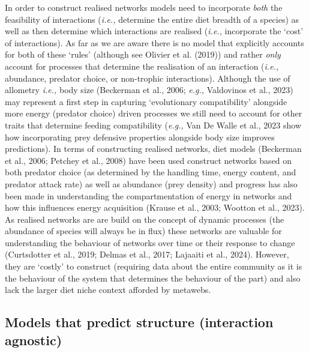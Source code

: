 \documentclass[
]{article}
\begin{document}
In order to construct realised networks models need to incorporate
\emph{both} the feasibility of interactions (\emph{i.e.,} determine the
entire diet breadth of a species) as well as then determine which
interactions are realised (\emph{i.e.,} incorporate the `cost' of
interactions). As far as we are aware there is no model that explicitly
accounts for both of these `rules' (although see Olivier et al. (2019))
and rather \emph{only} account for processes that determine the
realisation of an interaction (\emph{i.e.,} abundance, predator choice,
or non-trophic interactions). Although the use of allometry \emph{i.e.,}
body size (Beckerman et al., 2006; \emph{e.g.,} Valdovinos et al., 2023)
may represent a first step in capturing `evolutionary compatibility'
alongside more energy (predator choice) driven processes we still need
to account for other traits that determine feeding compatibility
(\emph{e.g.,} Van De Walle et al., 2023 show how incorporating prey
defensive properties alongside body size improves predictions). In terms
of constructing realised networks, diet models (Beckerman et al., 2006;
Petchey et al., 2008) have been used construct networks based on both
predator choice (as determined by the handling time, energy content, and
predator attack rate) as well as abundance (prey density) and progress
has also been made in understanding the compartmentation of energy in
networks and how this influences energy acquisition (Krause et al.,
2003; Wootton et al., 2023). As realised networks are are build on the
concept of dynamic processes (the abundance of species will always be in
flux) these networks are valuable for understanding the behaviour of
networks over time or their response to change (Curtsdotter et al.,
2019; Delmas et al., 2017; Lajaaiti et al., 2024). However, they are
`costly' to construct (requiring data about the entire community as it
is the behaviour of the system that determines the behaviour of the
part) and also lack the larger diet niche context afforded by metawebs.

\subsection{Models that predict structure (interaction
agnostic)}\label{models-that-predict-structure-interaction-agnostic}
\end{document}
